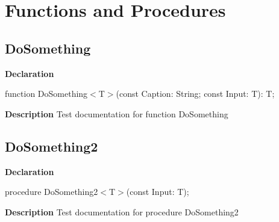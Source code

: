 \documentclass{report}
\newif\ifpdf
\begin{document}
\section{Functions and Procedures}
\ifpdf
\subsection*{\large{\textbf{DoSomething}}\normalsize\hspace{1ex}\hrulefill}
\else
\subsection*{DoSomething}
\fi
\label{ok_generic_routines-DoSomething}
\begin{list}{}{
\setlength{\itemindent}{0cm}
\setlength{\listparindent}{0cm}
\setlength{\leftmargin}{\evensidemargin}
\addtolength{\leftmargin}{\tmplength}
\settowidth{\labelsep}{X}
\addtolength{\leftmargin}{\labelsep}
\setlength{\labelwidth}{\tmplength}
}
\item[\textbf{Declaration}\hfill]
\ifpdf
\begin{flushleft}
\fi
\begin{ttfamily}
function DoSomething{$<$}T{$>$}(const Caption: String; const Input: T): T;\end{ttfamily}

\ifpdf
\end{flushleft}
\fi

\par
\item[\textbf{Description}]
Test documentation for function DoSomething

\end{list}
\ifpdf
\subsection*{\large{\textbf{DoSomething2}}\normalsize\hspace{1ex}\hrulefill}
\else
\subsection*{DoSomething2}
\fi
\label{ok_generic_routines-DoSomething2}
\begin{list}{}{
\setlength{\itemindent}{0cm}
\setlength{\listparindent}{0cm}
\setlength{\leftmargin}{\evensidemargin}
\addtolength{\leftmargin}{\tmplength}
\settowidth{\labelsep}{X}
\addtolength{\leftmargin}{\labelsep}
\setlength{\labelwidth}{\tmplength}
}
\item[\textbf{Declaration}\hfill]
\ifpdf
\begin{flushleft}
\fi
\begin{ttfamily}
procedure DoSomething2{$<$}T{$>$}(const Input: T);\end{ttfamily}

\ifpdf
\end{flushleft}
\fi

\par
\item[\textbf{Description}]
Test documentation for procedure DoSomething2

\end{list}
\end{document}

